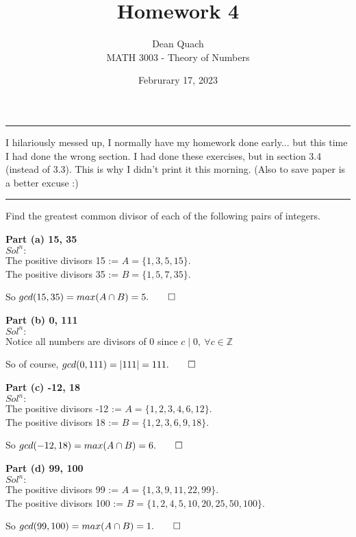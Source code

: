 \documentclass[12pt]{article}
\newcommand{\Z}{\mathbb{Z}}
\newenvironment{exercise}[2][Exercise]{\begin{trivlist}
\item[\hskip \labelsep {\bfseries #1}\hskip \labelsep {\bfseries #2.}]}{\end{trivlist}}
\begin{document}
 

 
 
\title{Homework 4}%
\author{Dean Quach\\ %
MATH 3003 - Theory of Numbers} %
\date{Februrary 17, 2023}
\maketitle

\hrule
\vspace{5pt}
I hilariously messed up, I normally have my homework done early... but this time I had done the wrong section. I had done these exercises, but in section 3.4 (instead of 3.3). This is why I didn't print it this morning. (Also to save paper is a better excuse :)
\hrule
\vspace{20pt}




\renewcommand\qedsymbol{$\square$} 
\begin{exercise}{3.3.1} Find the greatest common divisor of each of the following pairs of integers.
\end{exercise}
\textbf{Part (a) 15, 35}\\
$Sol^n:$\\
The positive divisors 15 := $A=\{1,3,5,15\}$.\\
The positive divisors 35 := $B=\{1,5,7,35\}$.
\begin{center}
So $gcd(15,35)=max(A\cap B)=5.\qed$
\end{center}

\noindent \textbf{Part (b) 0, 111}\\
$Sol^n:$\\
Notice all numbers are divisors of 0 since $c\mid 0,~\forall c\in \Z$
\begin{center}
So of course, \(gcd(0,111)=|111|=111.\qed\)
\end{center}

\noindent \textbf{Part (c) -12, 18}\\
$Sol^n:$\\
The positive divisors -12 := $A=\{1,2,3,4,6,12\}$.\\
The positive divisors 18 := $B=\{1,2,3,6,9,18\}$.
\begin{center}
So $gcd(-12,18)=max(A\cap B)=6.\qed$
\end{center}

\noindent \textbf{Part (d) 99, 100}\\
$Sol^n:$\\
The positive divisors 99 := $A=\{1,3,9,11,22,99\}$.\\
The positive divisors 100 := $B=\{1,2,4,5,10,20,25,50,100\}$.
\begin{center}
So $gcd(99,100)=max(A\cap B)=1.\qed$
\end{center}
\end{document}
